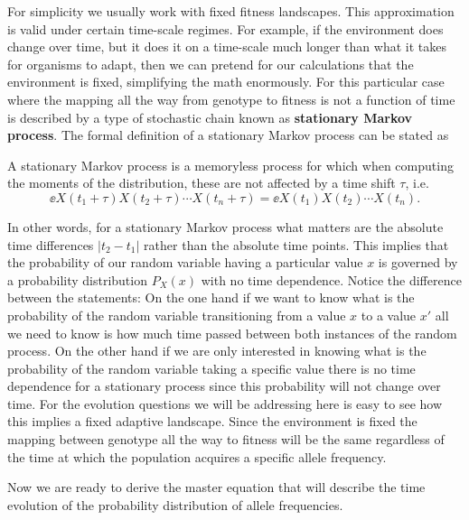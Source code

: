 For simplicity we usually work with fixed fitness landscapes. This
approximation is valid under certain time-scale regimes. For example, if the
environment does change over time, but it does it on a time-scale much longer
than what it takes for organisms to adapt, then we can pretend for our
calculations that the environment is fixed, simplifying the math enormously.
For this particular case where the mapping all the way from genotype to fitness
is not a function of time is described by a type of stochastic chain known as
\textbf{stationary Markov process}. The formal definition of a stationary
Markov process can be stated as
\begin{tcolorbox}
  A stationary Markov process is a memoryless process for which when computing
  the moments of the distribution, these are not affected by a time shift
  $\tau$, i.e.
  \begin{equation}
    \ee{X(t_1 + \tau) X(t_2 + \tau) \cdots X(t_n + \tau)} =
    \ee{X(t_1) X(t_2) \cdots X(t_n)}.
  \end{equation}
\end{tcolorbox}
In other words, for a stationary Markov process what matters are the absolute
time differences $|t_2 - t_1|$ rather than the absolute time points. This
implies that the probability of our random variable having a particular value
$x$ is governed by a probability distribution $P_X(x)$ with no time dependence.
Notice the difference between the statements: On the one hand if we want to
know what is the probability of the random variable transitioning from a value
$x$ to a value $x'$ all we need to know is how much time passed between both
instances of the random process. On the other hand if we are only interested in
knowing what is the probability of the random variable taking a specific value
there is no time dependence for a stationary process since this probability
will not change over time. For the evolution questions we will be addressing
here is easy to see how this implies a fixed adaptive landscape. Since the
environment is fixed the mapping between genotype all the way to fitness will
be the same regardless of the time at which the population acquires a specific
allele frequency.

Now we are ready to derive the master equation that will describe the time
evolution of the probability distribution of allele frequencies.
